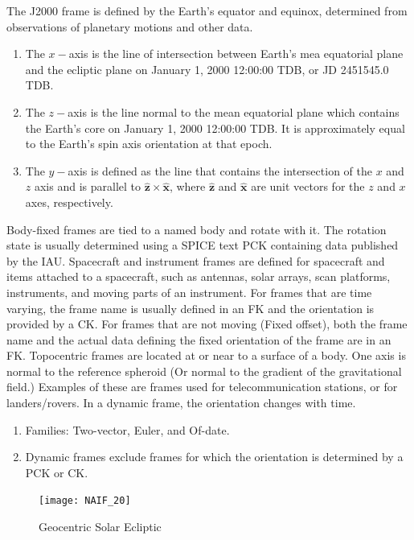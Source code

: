 \documentclass[crop=false,class=book]{standalone}
\begin{document}
\begin{definition}
The J2000 frame is defined by the Earth's equator and equinox, determined from observations of planetary motions and other data. 
\begin{enumerate}
    \item The $x-$axis is the line of intersection between Earth's mea equatorial plane and the ecliptic plane on January 1, 2000 12:00:00 TDB, or JD 2451545.0 TDB.
    \item The $z-$axis is the line normal to the mean equatorial plane which contains the Earth's core on January 1, 2000 12:00:00 TDB. It is approximately equal to the Earth's spin axis orientation at that epoch.
    \item The $y-$axis is defined as the line that contains the intersection of the $x$ and $z$ axis and is parallel to $\hat{\mathbf{z}}\times \hat{\mathbf{x}}$, where $\hat{\mathbf{z}}$ and $\hat{\mathbf{x}}$ are unit vectors for the $z$ and $x$ axes, respectively.
\end{enumerate}
\end{definition}
Body-fixed frames are tied to a named body and rotate with it. The rotation state is usually determined using a SPICE text PCK containing data published by the IAU. Spacecraft and instrument frames are defined for spacecraft and items attached to a spacecraft, such as antennas, solar arrays, scan platforms, instruments, and moving parts of an instrument. For frames that are time varying, the frame name is usually defined in an FK and the orientation is provided by a CK. For frames that are not moving (Fixed offset), both the frame name and the actual data defining the fixed orientation of the frame are in an FK. Topocentric frames are located at or near to a surface of a body. One axis is normal to the reference spheroid (Or normal to the gradient of the gravitational field.) Examples of these are frames used for telecommunication stations, or for landers/rovers. In a dynamic frame, the orientation changes with time.
\begin{enumerate}
    \item[] Families: Two-vector, Euler, and Of-date.
    \item[] Dynamic frames exclude frames for which the orientation is determined by a PCK or CK.
\end{enumerate}
\begin{figure}[H]
    \centering
    \texttt{[image: NAIF\_20]}
    \caption{Geocentric Solar Ecliptic}
    \label{fig:naif_geocentric_solar_ecliptic}
\end{figure}
\end{document}
